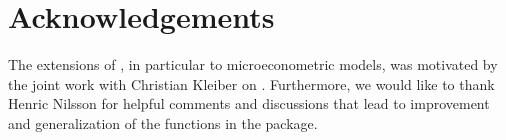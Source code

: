 \documentclass{Z}
\begin{document}
\section*{Acknowledgements}

The extensions of , in particular to microeconometric models,
was motivated by the joint work with Christian Kleiber on \cite{hac:Kleiber+Zeileis:2006}.
Furthermore, we would like to thank Henric Nilsson for helpful comments and discussions that
lead to improvement and generalization of the functions in the package.


\end{document}

